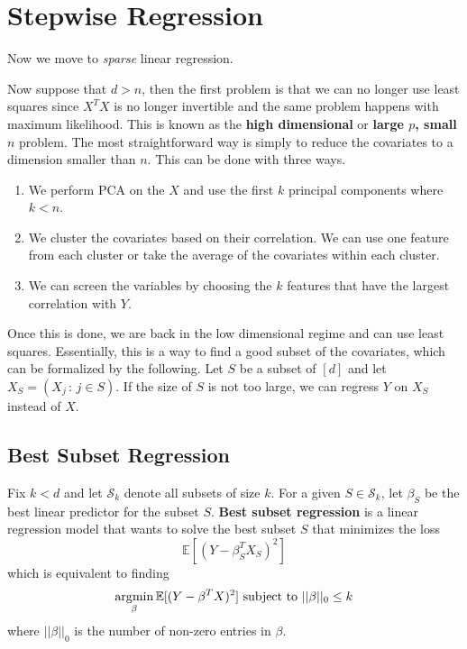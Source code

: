 \section{Stepwise Regression} 

  Now we move to \textit{sparse} linear regression. 

  Now suppose that $d > n$, then the first problem is that we can no longer use least squares since $X^T X$ is no longer invertible and the same problem happens with maximum likelihood. This is known as the \textbf{high dimensional} or \textbf{large $p$, small $n$} problem. The most straightforward way is simply to reduce the covariates to a dimension smaller than $n$. This can be done with three ways. 
  \begin{enumerate}
    \item We perform PCA on the $X$ and use the first $k$ principal components where $k < n$. 
    \item We cluster the covariates based on their correlation. We can use one feature from each cluster or take the average of the covariates within each cluster. 
    \item We can screen the variables by choosing the $k$ features that have the largest correlation with $Y$. 
  \end{enumerate}
  Once this is done, we are back in the low dimensional regime and can use least squares. Essentially, this is a way to find a good subset of the covariates, which can be formalized by the following. Let $S$ be a subset of $[d]$ and let $X_S = (X_j \,:\, j \in S)$. If the size of $S$ is not too large, we can regress $Y$ on $X_S$ instead of $X$. 

\subsection{Best Subset Regression}

  \begin{definition}
    Fix $k < d$ and let $\mathcal{S}_k$ denote all subsets of size $k$. For a given $S \in \mathcal{S}_k$, let $\beta_S$ be the best linear predictor for the subset $S$. \textbf{Best subset regression} is a linear regression model that wants to solve the best subset $S$ that minimizes the loss 
    \begin{equation}
      \mathbb{E} [ (Y - \beta_S^T X_S)^2] 
    \end{equation}
    which is equivalent to finding 
    \begin{equation}
      \operatorname*{\arg\!\min}_{\beta} \mathbb{E} [ (Y - \beta^T X)^2] \text{ subject to } ||\beta||_0 \leq k
    \end{equation}
    where $||\beta||_0$ is the number of non-zero entries in $\beta$. 
  \end{definition}

